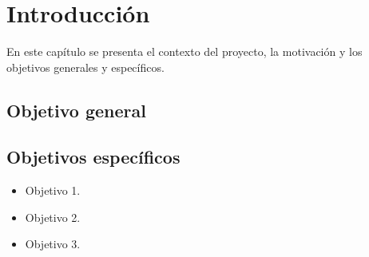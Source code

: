 \section{Introducción}

En este capítulo se presenta el contexto del proyecto, la motivación
y los objetivos generales y específicos.

\subsection{Objetivo general}

\subsection{Objetivos específicos}

\begin{itemize}
  \item Objetivo 1.
  \item Objetivo 2.
  \item Objetivo 3.
\end{itemize}
